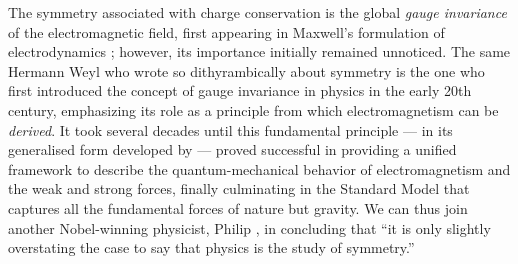 The symmetry  associated with charge conservation is the global {\em gauge invariance} of the electromagnetic field, first appearing in Maxwell's formulation of electrodynamics  \citep{maxwell1865viii};  %
however, its importance initially remained unnoticed. %
%
The same Hermann Weyl 
who wrote so dithyrambically about symmetry %
is the one who first introduced the concept of gauge invariance in physics in the early 20th century, emphasizing its role as a %
principle from which electromagnetism can be {\em derived}. 
%
It took several decades until this fundamental principle — in its generalised form 
developed by \cite{yang1954conservation} — 
proved successful in providing a unified framework to describe the quantum-mechanical behavior of electromagnetism and the weak and strong forces, finally culminating in the Standard Model that captures all the fundamental forces of nature but gravity. 
%
We can thus join another Nobel-winning physicist, Philip \cite{anderson1972more}, in concluding that ``it is only slightly overstating the case to say that physics is the study of symmetry.'' 






